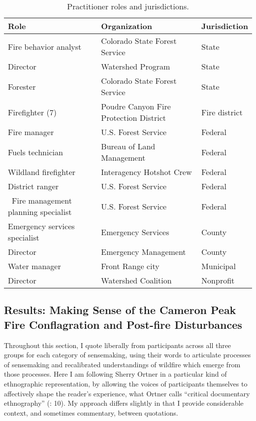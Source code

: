 \documentclass[
]{article}
\begin{document}
\captionsetup{width=6.5in}

\begin{table}[!h]
\centering\centering
\caption{\label{tab:ch4Tbl2}Practitioner roles and jurisdictions.}
\centering
\begin{tabu} to 
\toprule
Role & Organization & Jurisdiction\\
\midrule
Fire behavior analyst & Colorado State Forest Service & State\\
Director & Watershed Program & State\\
Forester & Colorado State Forest Service & State\\
Firefighter (7) & Poudre Canyon Fire Protection District & Fire district\\
Fire manager & U.S. Forest Service & Federal\\
\addlinespace
Fuels technician & Bureau of Land Management & Federal\\
Wildland firefighter & Interagency Hotshot Crew & Federal\\
District ranger & U.S. Forest Service & Federal\\
 Fire management planning specialist & U.S. Forest Service & Federal\\
Emergency services specialist & Emergency Services & County\\
\addlinespace
Director & Emergency Management & County\\
Water manager & Front Range city & Municipal\\
Director & Watershed Coalition & Nonprofit\\
\bottomrule
\end{tabu}
\end{table}

\subsection{Results: Making Sense of the Cameron Peak Fire Conflagration and Post-fire Disturbances}\label{results-making-sense-of-the-cameron-peak-fire-conflagration-and-post-fire-disturbances}

Throughout this section, I quote liberally from participants across all three groups for each category of sensemaking, using their words to articulate processes of sensemaking and recalibrated understandings of wildfire which emerge from those processes. Here I am following Sherry Ortner in a particular kind of ethnographic representation, by allowing the voices of participants themselves to affectively shape the reader's experience, what Ortner calls ``critical documentary ethnography'' (: 10). My approach differs slightly in that I provide considerable context, and sometimes commentary, between quotations.
\end{document}
